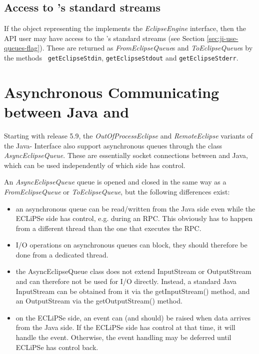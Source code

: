 \subsection{Access to {\eclipse}'s standard streams}
\label{sec:ji-standard-streams}
If the object representing the {\eclipse} implements the {\it
EclipseEngine}  interface, then the API user
may have access to the {\eclipse}'s standard streams (see Section
\ref{sec:ji-use-queues-flag}). These are returned as {\it
FromEclipseQueue}s and {\it ToEclipseQueue}s by the methods {\tt
getEclipseStdin}, {\tt getEclipseStdout} and {\tt getEclipseStderr}.

\section{Asynchronous Communicating between Java and {\eclipse}} 
\label{sec:ji-async-queue-streams}

Starting with release 5.9, the {\it OutOfProcessEclipse}
and {\it RemoteEclipse} variants of the Java-{\eclipse} Interface also support
asynchronous queues through the class {\it AsyncEclipseQueue}.
These are essentially socket connections between {\eclipse} and Java, which
can be used independently of which side has control. 

An {\it AsyncEclipseQueue} queue is opened and closed in the same way as 
a {\it FromEclipseQueue} or {\it ToEclipseQueue}, but the following
differences exist:
\begin{itemize}
\item an asynchronous queue can be read/written from the Java side
even while the ECLiPSe side has control, e.g. during an RPC.  This
obviously has to happen from a different thread than the one that
executes the RPC.
\item I/O operations on asynchronous queues can block, they should
therefore be done from a dedicated thread.
\item the AsyncEclipseQueue class does not extend InputStream or
OutputStream and can therefore not be used for I/O directly.  Instead,
a standard Java InputStream can be obtained from it via the
getInputStream() method, and an OutputStream via the getOutputStream()
method.
\item on the ECLiPSe side, an event can (and should) be raised when
data arrives from the Java side.  If the ECLiPSe side has control at
that time, it will handle the event.  Otherwise, the event handling
may be deferred until ECLiPSe has control back.
\end{itemize}

